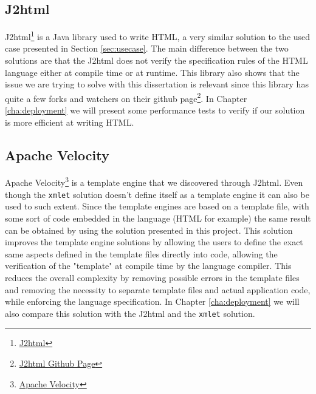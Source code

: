\subsection{J2html} %
\label{sec:j2html}

J2html\footnote{\href{https://j2html.com/}{J2html}} is a Java library used to write \ac{HTML}, a very similar solution to the used case presented in Section \ref{sec:usecase}. The main difference between the two solutions are that the J2html does not verify the specification rules of the \ac{HTML} language either at compile time or at runtime. This library also shows that the issue we are trying to solve with this dissertation is relevant since this library has quite a few forks and watchers on their github page\footnote{\href{https://github.com/tipsy/j2html}{J2html Github Page}}. In Chapter \ref{cha:deployment} we will present some performance tests to verify if our solution is more efficient at writing \ac{HTML}. 

\subsection{Apache Velocity} %
\label{sec:apachevelocity}

Apache Velocity\footnote{\href{http://velocity.apache.org/}{Apache Velocity}} is a template engine that we discovered through J2html. Even though the  \texttt{xmlet} solution doesn't define itself as a template engine it can also be used to such extent. Since the template engines are based on a template file, with some sort of code embedded in the language (\ac{HTML} for example) the same result can be obtained by using the solution presented in this project. This solution improves the template engine solutions by allowing the users to define the exact same aspects defined in the template files directly into code, allowing the verification of the "template" at compile time by the language compiler. This reduces the overall complexity by removing possible errors in the template files and removing the necessity to separate template files and actual application code, while enforcing the language specification. In Chapter \ref{cha:deployment} we will also compare this solution with the J2html and the \texttt{xmlet} solution.
